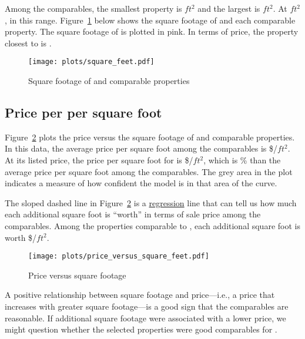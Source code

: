 \documentclass[
12pt, %
letterpaper, %
oneside, %
headinclude,footinclude, %
BCOR5mm, %
]{scrartcl}
\begin{document}
Among the comparables, the smallest property is \MinSize{}$ft^2$ and the largest is \MaxSize{}$ft^2$.
At \PropertySize{}$ft^2$, \PropertyName{} \InSizeRange{} in this range. 
Figure~\ref{fig:square_feet} below shows the square footage of \PropertyName{} and each comparable property.
The square footage of \PropertyName{} is plotted in pink. 
In terms of price, the property closest to \PropertyName{} is \ClosestOnSize{}.

\begin{figure}[h!]
\centering
\caption{Square footage of \PropertyName{} and comparable properties} \label{fig:square_feet}  
\texttt{[image: plots/square\_feet.pdf]} 
\end{figure}

\subsection{Price per per square foot}

Figure~\ref{fig:price_versus_square_feet} plots the price versus the square footage of \PropertyName{} and comparable properties.
In this data, the average price per square foot among the comparables is \$\MeanPricePerFoot{}/$ft^2$.
At its listed price, the price per square foot for \PropertyName{} is \$\MeanPricePerFootFocal{}/$ft^2$,
which is \MeanPricePerFootPct{}\% \ComparePricePerFoot{} than the average price per square foot among the comparables.
The grey area in the plot indicates a measure of how confident the model is in that area of the curve. 

The sloped dashed line in Figure~\ref{fig:price_versus_square_feet} is a \href{https://en.wikipedia.org/wiki/Linear_regression}{regression} line that can tell us how much each additional square foot is ``worth'' in terms of sale price among the comparables.
Among the properties comparable to \PropertyName{}, each additional square foot is worth \$\MarginalPricePerFoot{}/$ft^2$. 

\begin{figure}
\centering
\caption{Price versus square footage} \label{fig:price_versus_square_feet}  
\texttt{[image: plots/price\_versus\_square\_feet.pdf]} 
\end{figure}

A positive relationship between square footage and price---i.e., a price that increases with greater square footage---is a good sign that the comparables are reasonable.
If additional square footage were associated with a lower price, we might question whether the selected properties were good comparables for \PropertyName{}. 
\end{document}

